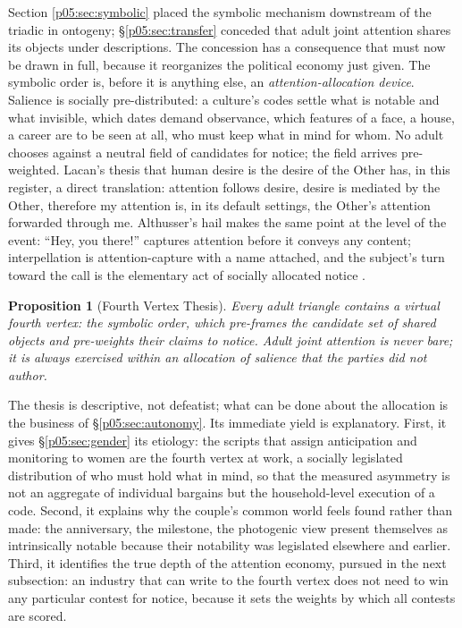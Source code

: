 \documentclass[11pt,a4paper]{article}
\theoremstyle{seriesthm}
\newtheorem{prop}{Proposition}
\begin{document}
Section \ref{p05:sec:symbolic} placed the symbolic mechanism downstream of the triadic in ontogeny; §\ref{p05:sec:transfer} conceded that adult joint attention shares its objects under descriptions. The concession has a consequence that must now be drawn in full, because it reorganizes the political economy just given. The symbolic order is, before it is anything else, an \emph{attention-allocation device}. Salience is socially pre-distributed: a culture's codes settle what is notable and what invisible, which dates demand observance, which features of a face, a house, a career are to be seen at all, who must keep what in mind for whom. No adult chooses against a neutral field of candidates for notice; the field arrives pre-weighted. Lacan's thesis that human desire is the desire of the Other has, in this register, a direct translation: attention follows desire, desire is mediated by the Other, therefore my attention is, in its default settings, the Other's attention forwarded through me. Althusser's hail makes the same point at the level of the event: ``Hey, you there!'' captures attention before it conveys any content; interpellation is attention-capture with a name attached, and the subject's turn toward the call is the elementary act of socially allocated notice \parencite{althusser1971}.

\begin{prop}[Fourth Vertex Thesis]\label{p05:prop:fourth}
Every adult triangle contains a virtual fourth vertex: the symbolic order, which pre-frames the candidate set of shared objects and pre-weights their claims to notice. Adult joint attention is never bare; it is always exercised within an allocation of salience that the parties did not author.
\end{prop}

The thesis is descriptive, not defeatist; what can be done about the allocation is the business of §\ref{p05:sec:autonomy}. Its immediate yield is explanatory. First, it gives §\ref{p05:sec:gender} its etiology: the scripts that assign anticipation and monitoring to women are the fourth vertex at work, a socially legislated distribution of who must hold what in mind, so that the measured asymmetry \parencite{daminger2019} is not an aggregate of individual bargains but the household-level execution of a code. Second, it explains why the couple's common world feels found rather than made: the anniversary, the milestone, the photogenic view present themselves as intrinsically notable because their notability was legislated elsewhere and earlier. Third, it identifies the true depth of the attention economy, pursued in the next subsection: an industry that can write to the fourth vertex does not need to win any particular contest for notice, because it sets the weights by which all contests are scored.
\end{document}
